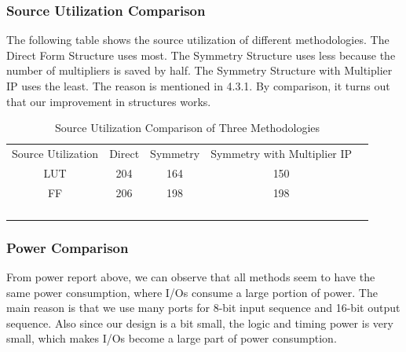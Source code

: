 \documentclass[a4paper]{article}
\begin{document}
\subsubsection{Source Utilization Comparison}
The following table shows the source utilization of different methodologies. The Direct Form Structure uses most. The Symmetry Structure uses less because the number of multipliers is saved by half. The Symmetry Structure with Multiplier IP uses the least. The reason is mentioned in 4.3.1. By comparison, it turns out that our improvement in structures works.
\begin{table}[]
\centering
\begin{tabular}{ccccl}
\cline{1-4}
\multicolumn{1}{|c|}{Source Utilization} & \multicolumn{1}{c|}{Direct} & \multicolumn{1}{c|}{Symmetry} & \multicolumn{1}{c|}{Symmetry with Multiplier IP} &  \\ \cline{1-4}
\multicolumn{1}{|c|}{LUT} & \multicolumn{1}{c|}{204} & \multicolumn{1}{c|}{164} & \multicolumn{1}{c|}{150} &  \\ \cline{1-4}
\multicolumn{1}{|c|}{FF}  & \multicolumn{1}{c|}{206} & \multicolumn{1}{c|}{198} & \multicolumn{1}{c|}{198} &  \\ \cline{1-4}
                          &                          &                          &                          &  \\
                          &                          &                          &                          &  \\
                          &                          &                          &                          &  \\
                          &                          &                          &                          & 
\end{tabular}
\caption{Source Utilization Comparison of Three Methodologies}
\end{table}

\subsubsection{Power Comparison}
From power report above, we can observe that all methods seem to have the same power consumption, where I/Os consume a large portion of power. The main reason is that we use many ports for 8-bit input sequence and 16-bit output sequence. Also since our design is a bit small, the logic and timing power is very small, which makes I/Os become a large part of power consumption.
\end{document}
